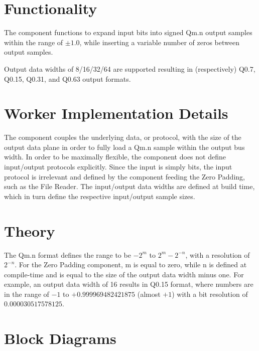 \section*{Functionality}
\begin{flushleft}
	The {\Comp} component functions to expand input bits into signed Qm.n output samples within the range of $\pm1.0$, while inserting a variable number of zeros between output samples.\medskip

	Output data widths of 8/16/32/64 are supported resulting in (respectively) Q0.7, Q0.15, Q0.31, and Q0.63 output formats.
\end{flushleft}

\section*{Worker Implementation Details}
\begin{flushleft}
	The {\Comp} component couples the underlying data, or protocol, with the size of the output data plane in order to fully load a Qm.n sample within the output bus width. In order to be maximally flexible, the component does not define input/output protocols explicitly. Since the input is simply bits, the input protocol is irrelevant and defined by the component feeding the Zero Padding, such as the File Reader. The input/output data widths are defined at build time, which in turn define the respective input/output sample sizes.
\end{flushleft}

\section*{Theory}
\begin{flushleft}
	The Qm.n format defines the range to be $-2^{m}$ to $2^{m}-2^{-n}$, with a resolution of $2^{-n}$. For the Zero Padding component, m is equal to zero, while n is defined at compile-time and is equal to the size of the output data width minus one. For example, an output data width of 16 results in Q0.15 format, where numbers are in the range of $-1$ to $+0.999969482421875$ (almost $+1$) with a bit resolution of $0.000030517578125$.
\end{flushleft}

\section*{Block Diagrams}
